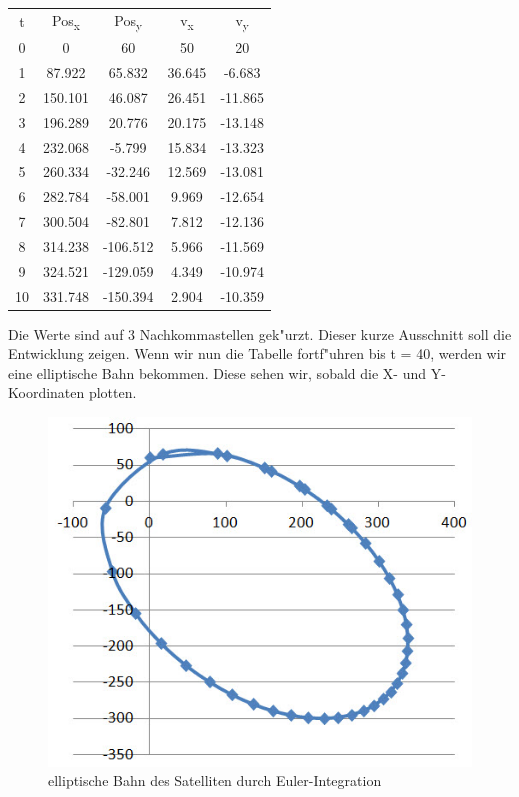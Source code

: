 \documentclass[11pt]{report}
\begin{document}
\begin{tabular}{ccccc}
t & Pos\textsubscript{x} & Pos\textsubscript{y} & v\textsubscript{x} & v\textsubscript{y} \\
0 & 0 & 60 & 50 & 20 \\
1 & 87.922 & 65.832 & 36.645 & -6.683 \\
2 & 150.101 & 46.087 & 26.451 & -11.865 \\
3 & 196.289 & 20.776 & 20.175 & -13.148 \\
4 & 232.068 & -5.799 & 15.834 & -13.323  \\
5 & 260.334 & -32.246 & 12.569 & -13.081 \\
6 & 282.784 & -58.001 & 9.969 & -12.654 \\
7 & 300.504 & -82.801 & 7.812 & -12.136 \\
8 & 314.238 & -106.512 & 5.966 & -11.569 \\
9 & 324.521 & -129.059 & 4.349 & -10.974 \\
10 & 331.748 & -150.394 & 2.904 & -10.359
\end{tabular}
\linebreak

Die Werte sind auf 3 Nachkommastellen gek"urzt. Dieser kurze Ausschnitt soll die Entwicklung zeigen. Wenn wir nun die Tabelle fortf"uhren bis t = 40, werden wir eine elliptische Bahn bekommen. Diese sehen wir, sobald die X- und Y-Koordinaten plotten.
\linebreak
\begin{figure}[H]
\centering
\includegraphics[width=13cm]{elliptische_bahn.jpg}
\caption{elliptische Bahn des Satelliten durch Euler-Integration}
\label{fig6}
\end{figure}
\end{document}
